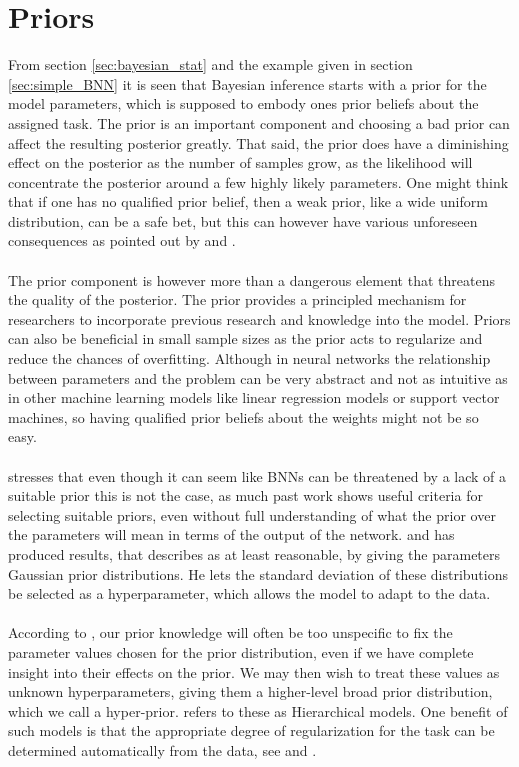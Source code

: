 \clearpage
\section{Priors}\label{sec:priors}
From section \ref{sec:bayesian_stat} and the example given in section \ref{sec:simple_BNN} it is seen that Bayesian inference starts with a prior for the model parameters, which is supposed to embody ones prior beliefs about the assigned task. The prior is an important component and choosing a bad prior can affect the resulting posterior greatly. That said, the prior does have a diminishing effect on the posterior as the number of samples grow, as the likelihood will concentrate the posterior around a few highly likely parameters. One might think that if one has no qualified prior belief, then a weak prior, like a wide uniform distribution, can be a safe bet, but this can however have various unforeseen consequences as pointed out by \cite{lemoine2019} and \cite{sarma_kay2020}. \\
\\
The prior component is however more than a dangerous element that threatens the quality of the posterior. The prior provides a principled mechanism for researchers to incorporate previous research and knowledge into the model. Priors can also be beneficial in small sample sizes as the prior acts to regularize and reduce the chances of overfitting.
Although in neural networks the relationship between parameters and the problem can be very abstract and not as intuitive as in other machine learning models like linear regression models or support vector machines, so having qualified prior beliefs about the weights might not be so easy. 
\\
\\
\cite{neal2012bayesian} stresses that even though it can seem like BNNs can be threatened by a lack of a suitable prior this is not the case, as much past work shows useful criteria for selecting suitable priors, even without full understanding of what the prior over the parameters will mean in terms of the output of the network. \cite{mackay1991} and \cite{MacKay1992} has produced results, that \cite{neal2012bayesian} describes as at least reasonable, by giving the parameters Gaussian prior distributions. He lets the standard deviation of these distributions be selected as a hyperparameter, which allows the model to adapt to the data. 
\\
\\
According to \cite{neal2012bayesian}, our prior knowledge will often be too unspecific to fix the parameter values chosen for the prior distribution, even if we have complete insight into their effects on the prior. We may then wish to treat these values as unknown hyperparameters, giving them a higher-level broad prior distribution, which we call a hyper-prior. \cite{neal2012bayesian} refers to these as Hierarchical models. One benefit of such models is that the appropriate degree of regularization for the task can be determined automatically from the data, see \cite{mackay1991} and \cite{MacKay1992}. 







